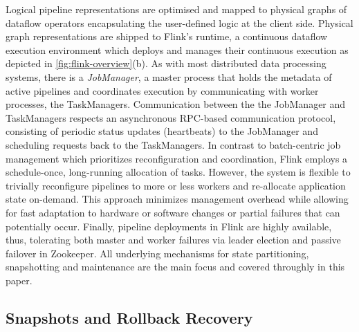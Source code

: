 Logical pipeline representations are optimised and mapped to physical graphs of dataflow operators encapsulating the user-defined logic at the client side. Physical graph representations are shipped to Flink's runtime, a continuous dataflow execution environment which deploys and manages their continuous execution as depicted in \autoref{fig:flink-overview}(b). As with most distributed data processing systems, there is a \emph{JobManager}, a master process that holds the metadata of active pipelines and coordinates execution by communicating with worker processes, the TaskManagers. Communication between the the JobManager and TaskManagers respects an asynchronous RPC-based communication protocol, consisting of periodic status updates (heartbeats) to the JobManager and scheduling requests back to the TaskManagers. In contrast to batch-centric job management \cite{zaharia2012discretized,venkataramandrizzle} which prioritizes reconfiguration and coordination, Flink employs a schedule-once, long-running allocation of tasks. However, the system is flexible to trivially reconfigure pipelines to more or less workers and re-allocate application state on-demand. This approach minimizes management overhead while allowing for fast adaptation to hardware or software changes or partial failures that can potentially occur. Finally, pipeline deployments in Flink are highly available, thus, tolerating both master and worker failures via leader election and passive failover in Zookeeper. All underlying mechanisms for state partitioning, snapshotting and maintenance are the main focus and covered throughly in this paper.


\subsection{Snapshots and Rollback Recovery}
